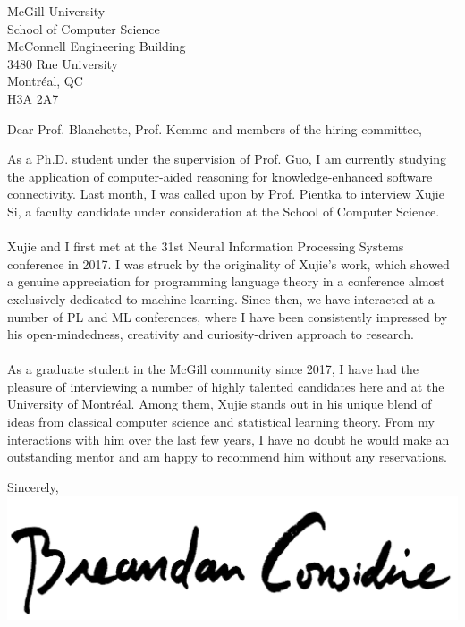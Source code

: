 \documentclass{letter}
\begin{document}
    \begin{letter}{McGill University\\School of Computer Science\\McConnell Engineering Building\\3480 Rue University\\Montr\'eal, QC\\H3A 2A7}
        \opening{Dear Prof. Blanchette, Prof. Kemme and members of the hiring committee,}
        As a Ph.D. student under the supervision of Prof. Guo, I am currently studying the application of computer-aided reasoning for knowledge-enhanced software connectivity. Last month, I was called upon by Prof. Pientka to interview Xujie Si, a faculty candidate under consideration at the School of Computer Science.\\\\
        Xujie and I first met at the 31st Neural Information Processing Systems conference in 2017. I was struck by the originality of Xujie's work, which showed a genuine appreciation for programming language theory in a conference almost exclusively dedicated to machine learning. Since then, we have interacted at a number of PL and ML conferences, where I have been consistently impressed by his open-mindedness, creativity and curiosity-driven approach to research.\\\\
        As a graduate student in the McGill community since 2017, I have had the pleasure of interviewing a number of highly talented candidates here and at the University of Montr\'eal. Among them, Xujie stands out in his unique blend of ideas from classical computer science and statistical learning theory. From my interactions with him over the last few years, I have no doubt he would make an outstanding mentor and am happy to recommend him without any reservations.\\
        \closing{Sincerely,\\
            \includegraphics[scale=0.06]{signature.png}\\
        }
    \end{letter}
\end{document}
